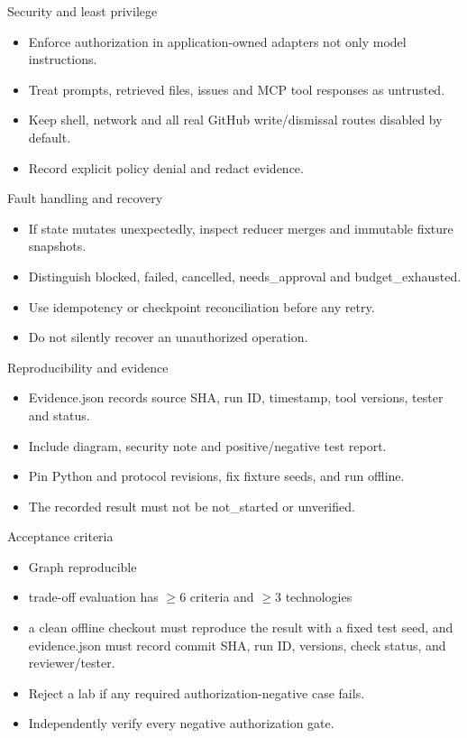 \documentclass[aspectratio=169,10pt]{beamer}
\begin{document}
\begin{frame}{Security and least privilege}
\small
\begin{itemize}
\item Enforce authorization in application-owned adapters not only model instructions.
\item Treat prompts, retrieved files, issues and MCP tool responses as untrusted.
\item Keep shell, network and all real GitHub write/dismissal routes disabled by default.
\item Record explicit policy denial and redact evidence.
\end{itemize}

\end{frame}

\begin{frame}{Fault handling and recovery}
\small
\begin{itemize}
\item If state mutates unexpectedly, inspect reducer merges and immutable fixture snapshots.
\item Distinguish blocked, failed, cancelled, needs\_approval and budget\_exhausted.
\item Use idempotency or checkpoint reconciliation before any retry.
\item Do not silently recover an unauthorized operation.
\end{itemize}

\end{frame}

\begin{frame}{Reproducibility and evidence}
\small
\begin{itemize}
\item Evidence.json records source SHA, run ID, timestamp, tool versions, tester and status.
\item Include diagram, security note and positive/negative test report.
\item Pin Python and protocol revisions, fix fixture seeds, and run offline.
\item The recorded result must not be not\_started or unverified.
\end{itemize}

\end{frame}

\begin{frame}{Acceptance criteria}
\small
\begin{itemize}
\item Graph reproducible
\item trade-off evaluation has $\geq$6 criteria and $\geq$3 technologies
\item a clean offline checkout must reproduce the result with a fixed test seed, and evidence.json must record commit SHA, run ID, versions, check status, and reviewer/tester.
\item Reject a lab if any required authorization-negative case fails.
\item Independently verify every negative authorization gate.
\end{itemize}

\end{frame}
\end{document}
